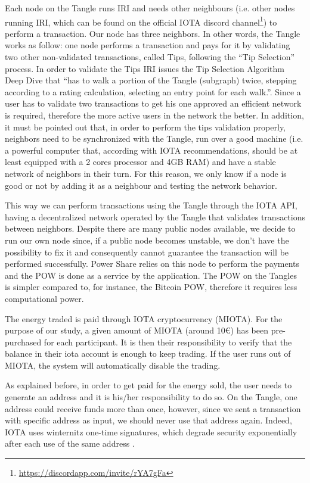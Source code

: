 Each node on the Tangle runs \ac{IRI} and needs other neighbours (i.e. other nodes running \ac{IRI}, which can be found on the official IOTA discord channel\footnote{\url{https://discordapp.com/invite/rYA7gFa}}) to perform a transaction.  Our node has three neighbors. In other words, the Tangle works as follow: one node performs a transaction and pays for it by validating two other non-validated transactions, called Tips, following the “Tip Selection” process. In order to validate the Tips \ac{IRI} issues the Tip Selection Algorithm Deep Dive that “has to walk a portion of the Tangle (subgraph) twice, stepping according to a rating calculation, selecting an entry point for each walk.”\cite{iotatips}. Since a user has to validate two transactions to get his one approved an efficient network is required, therefore the more active users in the network the better. In addition, it must be pointed out that, in order to perform the tips validation properly, neighbors need to be synchronized with the Tangle, run over a good machine (i.e. a powerful computer that, according with IOTA recommendations, should be at least equipped with a 2 cores processor and 4GB RAM) and have a stable network of neighbors in their turn. For this reason, we only know if a node is good or not by adding it as a neighbour and testing the network behavior. 


This way we can perform transactions using the Tangle through the IOTA \ac{API}, having a decentralized network operated by the Tangle that validates transactions between neighbors. Despite there are many public nodes available, we decide to run our own node since, if a public node becomes unstable, we don't have the possibility to fix it and consequently cannot guarantee the transaction will be performed successfully.  Power Share relies on this node to perform the payments and the \ac{POW} is done as a service by the application. The POW on the Tangles is simpler compared to, for instance, the Bitcoin \ac{POW}, therefore it requires less computational power.



The energy traded is paid through IOTA cryptocurrency (MIOTA). For the purpose of our study, a given amount of MIOTA (around 10€) has been pre-purchased for each participant. It is then their responsibility to verify that the balance in their iota account is enough to keep trading. If the user runs out of MIOTA, the system will automatically disable the trading. 


As explained before, in order to get paid for the energy sold, the user needs to generate an address and it is his/her responsibility to do so. On the Tangle, one address could receive funds more than once, however, since we sent a transaction with specific address as input, we should never use that address again. Indeed, IOTA uses winternitz one-time signatures, which degrade security exponentially after each use of the same address \cite{iotaseeds}.



